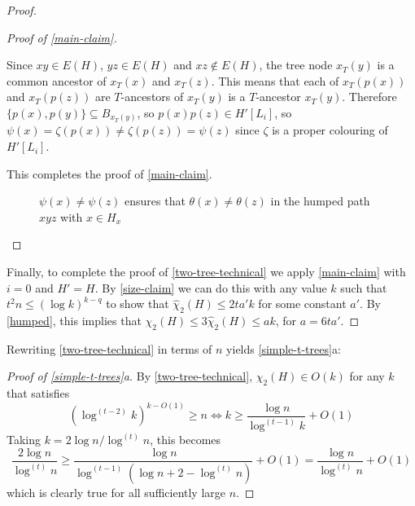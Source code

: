 \documentclass[kpfonts]{patmorin}
\newcommand{\trn}{\chi_2}
\newcommand{\htrn}{\hat{\chi}_2}
\theoremstyle{named}
\newcommand{\weirdref}[2]{\cref{#1}#2}
\begin{document}
\begin{proof}
\begin{proof}[Proof of \cref{main-claim}]
\begin{compactenum}
          Since $xy\in E(H)$, $yz\in E(H)$ and $xz\not\in E(H)$, the tree node
          $x_T(y)$ is a common ancestor of $x_T(x)$ and $x_T(z)$.  This means that each of $x_T(p(x))$ and $x_T(p(z))$ are $T$-ancestors of $x_T(y)$  is a $T$-ancestor $x_T(y)$. Therefore $\{p(x),p(y)\}\subseteq B_{x_T(y)}$, so $p(x)p(z)\in H'[L_i]$, so $\psi(x)=\zeta(p(x))\neq\zeta(p(z))=\psi(z)$ since $\zeta$ is a proper colouring of $H'[L_i]$.
      \end{compactenum}
      This completes the proof of \cref{main-claim}.
       \begin{figure}
           \caption{$\psi(x)\neq\psi(z)$ ensures that $\theta(x)\neq \theta(z)$ in the humped path $xyz$ with $x\in H_x$}
           \label{proper}
       \end{figure}
    \end{proof}
    Finally, to complete the proof of \cref{two-tree-technical} we apply \cref{main-claim} with $i=0$ and $H'=H$.  By \cref{size-claim} we can do this with any value $k$ such that $t^2n \le (\log k)^{k-q}$ to show that $\htrn(H)\le 2ta'k$ for some constant $a'$.  By \cref{humped}, this implies that $\trn(H)\le 3\htrn(H)\le ak$, for $a=6ta'$.
\end{proof}

Rewriting \cref{two-tree-technical} in terms of $n$ yields \weirdref{simple-t-trees}{a}:

\begin{proof}[Proof of \weirdref{simple-t-trees}{a}]
    By \cref{two-tree-technical}, $\trn(H)\in O(k)$ for any $k$ that satisfies
    \[  (\log^{(t-2)} k)^{k-O(1)} \ge n \Leftrightarrow
        k \ge \frac{\log n}{\log^{(t-1)} k} + O(1)
    \]
    Taking $k=2\log n/\log^{(t)} n$, this becomes
    \[
        \frac{2\log n}{\log^{(t)} n}
        \ge \frac{\log n}{\log^{(t-1)}(\log n + 2 -\log^{(t)} n)} + O(1)
        = \frac{\log n}{\log^{(t)} n} + O(1)
    \]
    which is clearly true for all sufficiently large $n$.
\end{proof}
\end{document}
